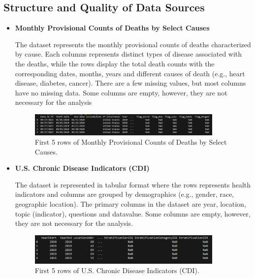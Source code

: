\documentclass[a4paper,10pt]{article}
\begin{document}
	\subsection{Structure and Quality of Data Sources}
	\begin{itemize}
		\item \textbf{Monthly Provisional Counts of Deaths by Select Causes}
		
		The dataset represents the monthly provisional counts of deaths characterized by cause. Each columns represents distinct types of disease associated with the deaths, while the rows display the total death counts with the corresponding dates, months, years and different causes of death (e.g., heart disease, diabetes, cancer). There are a few missing values, but most columns have no missing data. Some columns are empty, however, they are not necessary for the analysis
		\begin{figure}[ht!]
			\centering
			\includegraphics[width=0.9\textwidth]{images/dataset-1.png}
			\caption{First 5 rows of Monthly Provisional Counts of Deaths by Select Causes.}
			\label{fig:dataset1}
		\end{figure}
	\end{itemize}
	\begin{itemize}
		\item \textbf{U.S. Chronic Disease Indicators (CDI)} 
		
		The dataset is represented in tabular format where the rows represents health indicators and columns are grouped by demographics (e.g., gender, race, geographic location). The primary columns in the dataset are year, location, topic (indicator), questions and datavalue. Some columns are empty, however, they are not necessary for the analysis.
		\begin{figure}[ht!]
			\centering
			\includegraphics[width=0.9\textwidth]{images/dataset-2.png}
			\caption{First 5 rows of U.S. Chronic Disease Indicators (CDI).}
			\label{fig:dataset2}
		\end{figure}
		
	\end{itemize}
\end{document}
